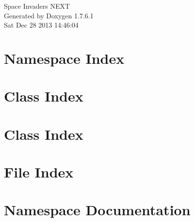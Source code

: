 \documentclass[a4paper]{book}
\begin{document}
\hypersetup{pageanchor=false,citecolor=blue}
\begin{titlepage}
\vspace*{7cm}
\begin{center}
{\Large \-Space \-Invaders \-N\-E\-X\-T }\\
\vspace*{1cm}
{\large \-Generated by Doxygen 1.7.6.1}\\
\vspace*{0.5cm}
{\small Sat Dec 28 2013 14:46:04}\\
\end{center}
\end{titlepage}
\clearemptydoublepage
{}
\tableofcontents
\clearemptydoublepage
{}
\hypersetup{pageanchor=true,citecolor=blue}
\chapter{\-Namespace \-Index}

\chapter{\-Class \-Index}

\chapter{\-Class \-Index}

\chapter{\-File \-Index}

\chapter{\-Namespace \-Documentation}






\end{document}
